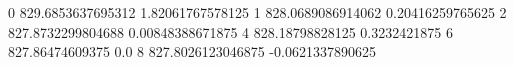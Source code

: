 0 829.6853637695312 1.82061767578125
1 828.0689086914062 0.20416259765625
2 827.8732299804688 0.00848388671875
4 828.18798828125 0.3232421875
6 827.86474609375 0.0
8 827.8026123046875 -0.0621337890625
